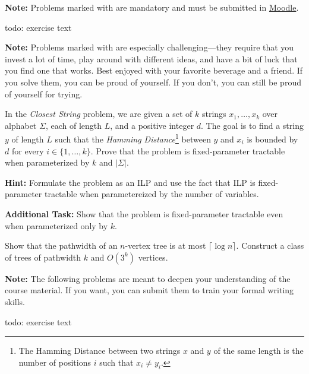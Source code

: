 \documentclass{uebung_cs}
\begin{document}
\textbf{Note:} Problems marked with \mandatory are mandatory and must be submitted in \href{https://moodle.studiumdigitale.uni-frankfurt.de/moodle/course/view.php?id=6259}{Moodle}.

\begin{exercise}
  todo: exercise text
\end{exercise}

\textbf{Note:} Problems marked with \hard are especially challenging---they require that you invest a lot of time, play around with different ideas, and have a bit of luck that you find one that works. Best enjoyed with your favorite beverage and a friend. If you solve them, you can be proud of yourself. If you don't, you can still be proud of yourself for trying.

\begin{exercise}
In the \emph{Closest String} problem, we are given a set of $k$ strings $x_1,\dots,x_k$ over alphabet $\Sigma$, each of length $L$, and a positive integer $d$. The goal is to find a string $y$ of length $L$ such that the \emph{Hamming Distance}\footnote{The Hamming Distance between two strings $x$ and $y$ of the same length is the number of positions $i$ such that $x_i \neq y_i$.} between $y$ and $x_i$ is bounded by $d$ for every $i\in \{1,\dots,k\}$. Prove that the problem is fixed-parameter tractable when parameterized by $k$ and $|\Sigma|$.

\noindent\textbf{Hint:} Formulate the problem as an ILP and use the fact that ILP is fixed-parameter tractable when parametereized by the number of variables.


\noindent\textbf{Additional Task:} Show that the problem is fixed-parameter tractable even when parameterized only by $k$.
\end{exercise}

\begin{exercise}
Show that the pathwidth of an $n$-vertex tree is at most $\lceil \log n \rceil$. Construct a class of trees of pathwidth $k$ and $O(3^k)$ vertices.
\end{exercise}

\newpage
\textbf{Note:} The following problems are meant to deepen your understanding of the course material. If you want, you can submit them to train your formal writing skills.

\begin{exercise}
  todo: exercise text
\end{exercise}
\end{document}
